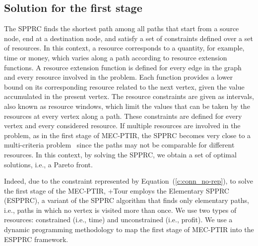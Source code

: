 \subsection{Solution for the first stage} 
\label{sec:alg-first-stage}
The SPPRC finds the shortest path among all paths that start from a source node, end at a destination node, and satisfy a set of constraints defined over a set of resources. In this context, a resource corresponds to a quantity, for example, time or money, which varies along a path according to resource extension functions. A resource extension function is defined for every edge in the graph and every resource involved in the problem. Each function provides a lower bound on its corresponding resource related to the next vertex, given the value accumulated in the present vertex. The resource constraints are given as intervals, also known as resource windows, which limit the values that can be taken by the resources at every vertex along a path. These constraints are defined for every vertex and every considered resource. If multiple resources are involved in the problem, as in the first stage of MEC-PTIR, the SPPRC becomes very close to a multi-criteria problem~\cite{irnich-shortest:05} since the paths may not be comparable for different resources. In this context, by solving the SPPRC, we obtain a set of optimal solutions, i.e., a Pareto front.

Indeed, due to the constraint represented by Equation~(\ref{c:conn_no-rep}), to solve the first stage of the MEC-PTIR, +Tour employs the Elementary SPPRC (ESPPRC), a variant of the SPPRC algorithm that finds only elementary paths, i.e., paths in which no vertex is visited more than once. We use two types of resources: constrained (i.e., time) and unconstrained (i.e., profit). We use a dynamic programming methodology to map the first stage of MEC-PTIR into the ESPPRC framework.\\ 

